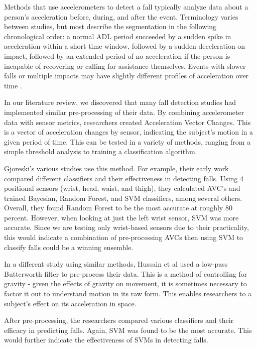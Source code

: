 \documentclass{llncs}
\begin{document}
    Methods that use accelerometers to detect a fall typically analyze data about a person's acceleration before, during, and after the event. Terminology varies between studies, but most describe the segmentation in the following chronological order: a normal ADL period succeeded by a sudden spike in acceleration within a short time window, followed by a sudden deceleration on impact, followed by an extended period of no acceleration if the person is incapable of recovering or calling for assistance themselves. Events with slower falls or multiple impacts may have slightly different profiles of acceleration over time \cite{kangas2009sensitivity}.

    In our literature review, we discovered that many fall detection studies had implemented similar pre-processing of their data. By combining accelerometer data with sensor metrics, researchers created Acceleration Vector Changes. This is a vector of acceleration changes by sensor, indicating the subject's motion in a given period of time. This can be tested in a variety of methods, ranging from a simple threshold analysis to training a classification algorithm.

    Gjoreski's various studies use this method. For example, their early work compared different classifiers and their effectiveness in detecting falls. Using 4 positional sensors (wrist, head, waist, and thigh), they calculated AVC's and trained Bayesian, Random Forest, and SVM classifiers, among several others. Overall, they found Random Forest to be the most accurate at roughly 80 percent. However, when looking at just the left wrist sensor, SVM was more accurate. Since we are testing only wrist-based sensors due to their practicality, this would indicate a combination of pre-processing AVCs then using SVM to classify falls could be a winning ensemble. \cite{gjoreski2016accurately}

    In a different study using similar methods, Hussain et al used a low-pass Butterworth filter to pre-process their data. This is a method of controlling for gravity - given the effects of gravity on movement, it is sometimes necessary to factor it out to understand motion in its raw form. This enables researchers to a subject's effect on its acceleration in space.

    After pre-processing, the researchers compared various classifiers and their efficacy in predicting falls. Again, SVM was found to be the most accurate. This would further indicate the effectiveness of SVMs in detecting falls.
\end{document}
